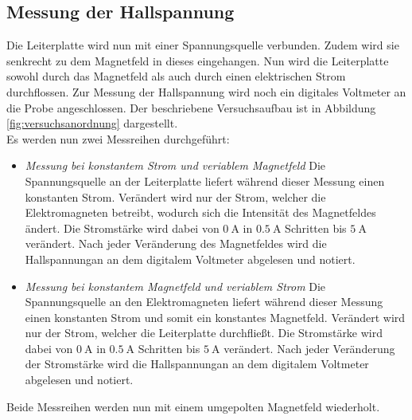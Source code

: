 \subsection{Messung der Hallspannung}
Die Leiterplatte wird nun mit einer Spannungsquelle verbunden. Zudem wird sie 
senkrecht zu dem Magnetfeld in dieses eingehangen. Nun wird die Leiterplatte sowohl durch das Magnetfeld
als auch durch einen elektrischen Strom durchflossen. Zur Messung der Hallspannung wird noch ein 
digitales Voltmeter an die Probe angeschlossen. Der beschriebene Versuchsaufbau ist in Abbildung
\ref{fig:versuchsanordnung} dargestellt.\\
Es werden nun zwei Messreihen durchgeführt:
\begin{itemize}
    \item \textit{Messung bei konstantem Strom und veriablem Magnetfeld}
        Die Spannungsquelle an der Leiterplatte liefert während dieser Messung einen konstanten Strom. 
        Verändert wird nur der Strom, welcher die Elektromagneten betreibt, wodurch sich die Intensität
        des Magnetfeldes ändert. Die Stromstärke wird dabei von $\SI{0}{\ampere}$ in $\SI{0.5}{\ampere}$
        Schritten bis $\SI{5}{\ampere}$ verändert. Nach jeder Veränderung des Magnetfeldes wird die 
        Hallspannungan an dem digitalem Voltmeter abgelesen und notiert.\\
    \item \textit{Messung bei konstantem Magnetfeld und veriablem Strom}
        Die Spannungsquelle an den Elektromagneten liefert während dieser Messung einen konstanten Strom und 
        somit ein konstantes Magnetfeld. 
        Verändert wird nur der Strom, welcher die Leiterplatte durchfließt.
        Die Stromstärke wird dabei von $\SI{0}{\ampere}$ in $\SI{0.5}{\ampere}$
        Schritten bis $\SI{5}{\ampere}$ verändert. Nach jeder Veränderung der Stromstärke wird die 
        Hallspannungan an dem digitalem Voltmeter abgelesen und notiert.\\
\end{itemize}
Beide Messreihen werden nun mit einem umgepolten Magnetfeld wiederholt.